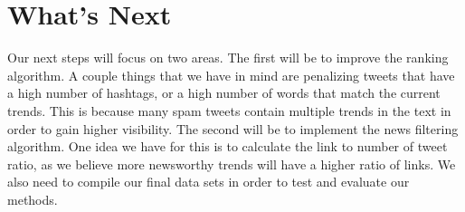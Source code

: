 \documentclass[]{article}
\begin{document}
\section{What's Next}
Our next steps will focus on two areas. The first will be to improve the ranking algorithm. A couple things that we have in mind are penalizing tweets that have a high number of hashtags, or a high number of words that match the current trends. This is because many spam tweets contain multiple trends in the text in order to gain higher visibility. The second will be to implement the news filtering algorithm. One idea we have for this is to calculate the link to number of tweet ratio, as we believe more newsworthy trends will have a higher ratio of links. We also need to compile our final data sets in order to test and evaluate our methods.
\end{document}
